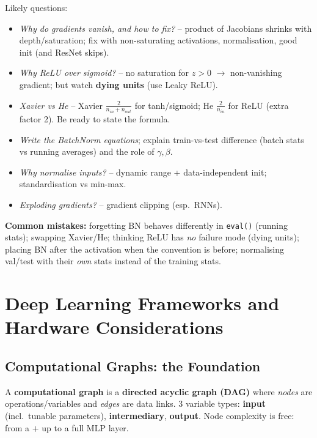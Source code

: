 \documentclass[10pt,a4paper]{article}
\begin{document}
	\begin{examtipbox}
		Likely questions:
		\begin{itemize}[leftmargin=*]
			\item \emph{Why do gradients vanish, and how to fix?} -- product of Jacobians shrinks with depth/saturation; fix with non-saturating activations, normalisation, good init (and ResNet skips).
			\item \emph{Why ReLU over sigmoid?} -- no saturation for $z>0$ $\rightarrow$ non-vanishing gradient; but watch \textbf{dying units} (use Leaky ReLU).
			\item \emph{Xavier vs He} -- Xavier $\frac{2}{n_{in}+n_{out}}$ for tanh/sigmoid; He $\frac{2}{n_{in}}$ for ReLU (extra factor 2). Be ready to state the formula.
			\item \emph{Write the BatchNorm equations}; explain train-vs-test difference (batch stats vs running averages) and the role of $\gamma,\beta$.
			\item \emph{Why normalise inputs?} -- dynamic range + data-independent init; standardisation vs min-max.
			\item \emph{Exploding gradients?} -- gradient clipping (esp.\ RNNs).
		\end{itemize}
		\textbf{Common mistakes:} forgetting BN behaves differently in \texttt{eval()} (running stats); swapping Xavier/He; thinking ReLU has \emph{no} failure mode (dying units); placing BN after the activation when the convention is before; normalising val/test with their \emph{own} stats instead of the training stats.
	\end{examtipbox}
	\section{Deep Learning Frameworks and Hardware Considerations}
	
	\subsection{Computational Graphs: the Foundation}

	\begin{definitionbox}
		A \textbf{computational graph} is a \textbf{directed acyclic graph (DAG)} where \emph{nodes} are operations/variables and \emph{edges} are data links. 3 variable types: \textbf{input} (incl.\ tunable parameters), \textbf{intermediary}, \textbf{output}. Node complexity is free: from a $+$ up to a full MLP layer.
	\end{definitionbox}
\end{document}
